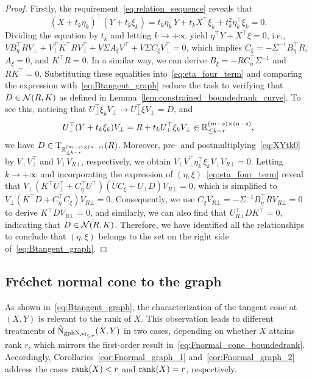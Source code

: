 \begin{proof}
Firstly, the requirement~\eqref{eq:relation_sequence} reveals that
\begin{equation}\label{eq:XYtk0}
(X+t_k\eta_k)^\top(Y+t_k\xi_k)=t_k\eta_k^\top Y+t_kX^\top \xi_k+t_k^2\eta_k^\top\xi_k=0.  
\end{equation}
Dividing the equation by $t_k$ and letting $k\to+\infty$ yield $\eta^\top Y+X^\top\xi=0$, i.e.,
$VB_\eta^\top RV_\bot + V_\bot^\top K^\top RV_\bot^\top + V\varSigma A_\xi V^\top + V\varSigma C_\xi V_\bot^\top = 0$,
which implies $C_\xi =-\varSigma^{-1}B_\eta^\top R$, $A_\xi=0$, and $K^\top R=0$. In a similar way, we can derive $B_\xi=-RC^\top_\eta\varSigma^{-1}$ and $RK^\top=0$. Substituting these equalities into~\eqref{eq:eta_four_term} and comparing the expression with~\eqref{eq:Btangent_graph} reduce the task to verifying that $D\in\mathcal{N}(R,K)$ as defined in Lemma~\ref{lem:constrained_boundedrank_curve}. To see this, noticing that $U_\bot^\top\xi_kV_\bot\to U_\bot^\top\xi V_\bot = D$, and
\begin{equation*}
    U_\bot^\top(Y+t_k\xi_k)V_\bot=R+t_kU_\bot^\top\xi_kV_\bot\in \mathbb{R}^{(m-s)\times (n-s)}_{\le k-r},
\end{equation*}
we have $D\in\mathrm{T}_{\mathbb{R}^{(m-s)\times (n-s)}_{\le k-r}}(R)$. Moreover, pre- and postmultiplying~\eqref{eq:XYtk0} by $V_\bot V_\bot^\top$ and $ V_\bot V_{R\bot}$, respectively, we obtain $V_\bot V_\bot^\top \eta_k^\top\xi_kV_\bot V_{R\bot}=0$. Letting $k\to+\infty$ and incorporating the expression of $(\eta,\xi)$~\eqref{eq:eta_four_term} reveal that $V_\bot(K^\top U_\bot^\top+C^\top_\eta U^\top)(UC_\xi+U_\bot D)V_{R\bot}=0$, which is simplified to $V_\bot(K^\top D+C_\eta^\top C_\xi)V_{R\bot}=0$. Consequently, we use $C_\xi V_{R\bot}=-\varSigma^{-1}B_\eta^\top RV_{R\bot}=0$ to derive $K^\top DV_{R\bot}=0$, and similarly, we can also find that $U_{R\bot}^\top DK^\top=0$, indicating that $D\in\mathcal{N}(R,K)$. Therefore, we have identified all the relationships to conclude that $(\eta,\xi)$ belongs to the set on the right side of~\eqref{eq:Btangent_graph}.
\end{proof}

 


\subsection{Fr\'echet normal cone to the graph}
As shown in~\eqref{eq:Btangent_graph}, the characterization of the tangent cone at $(X,Y)$ is relevant to the rank of $X$. This observation leads to different treatments of $\hat{\mathrm{N}}_{\mathrm{gph}\mathrm{N}_{\mathcal{M}_{\le r}}}(X,Y)$ in two cases, depending on whether $X$ attains rank $r$, which mirrors the first-order result in~\eqref{eq:Fnormal_cone_boundedrank}. Accordingly, Corollaries~\ref{cor:Fnormal_graph_1} and~\ref{cor:Fnormal_graph_2} address the cases $\operatorname{rank}(X)<r$ and $\operatorname{rank}(X)=r$, respectively.

